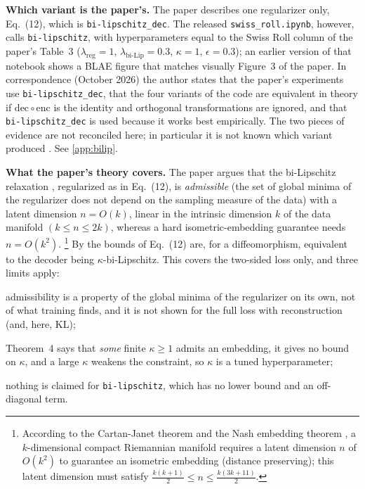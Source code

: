 \textbf{Which variant is the paper's.} The paper describes one regularizer only,
Eq.~(12), which is \texttt{bi-lipschitz\_dec}. The released \texttt{swiss\_roll.ipynb},
however, calls \texttt{bi-lipschitz}, with hyperparameters equal to the Swiss Roll column
of the paper's Table~3 ($\lambda_{\mathrm{reg}}=1$, $\lambda_{\text{bi-Lip}}=0.3$,
$\kappa=1$, $\epsilon=0.3$); an earlier version of that notebook shows a BLAE figure that
matches visually Figure~3 of the paper. In correspondence (October 2026) the author states that
the paper's experiments use \texttt{bi-lipschitz\_dec}, that the four variants of the code
are equivalent in theory if $\mathrm{dec}\circ\mathrm{enc}$ is the identity and orthogonal
transformations are ignored, and that \texttt{bi-lipschitz\_dec} is used because it works
best empirically. The two pieces of evidence are not reconciled here; in particular it is
not known which variant produced \cite[Figure~3]{zhan2026blae}. See \cref{app:bilip}.

\textbf{What the paper's theory covers.} The paper argues \cite[Theorem~4]{zhan2026blae}
that the bi-Lipschitz relaxation \cite[Definition~4]{zhan2026blae}, regularized as in
Eq.~(12), is \emph{admissible} \cite[Definition~3]{zhan2026blae} (the set of global minima
of the regularizer does not depend on the sampling measure of the data) with a latent
dimension $n=O(k)$, linear in the intrinsic dimension $k$ of the data manifold
$(k \leq n \leq 2k)$, whereas a hard isometric-embedding guarantee needs $n=O(k^2)$.
\footnote{According to the Cartan-Janet theorem \cite{burstin1931,cartan1927,janet1926} and the 
Nash embedding theorem \cite{nash1956}, a $k$-dimensional compact 
Riemannian manifold requires a latent dimension $n$ of $O(k^2)$ to guarantee an isometric embedding
(distance preserving); this latent dimension must satisfy 
$\frac{k(k+1)}{2} \le n \le \frac{k(3k+11)}{2}$.}
By \cite[Theorem~3]{zhan2026blae} the bounds of Eq.~(12) are, for a diffeomorphism,
equivalent to the decoder being $\kappa$-bi-Lipschitz. This covers the two-sided loss
only, and three limits apply: 
\begin{enumerate*}[label=(\roman*)]
\item admissibility is a property of the global minima of
the regularizer on its own, not of what training finds, and it is not shown for the full
loss with reconstruction (and, here, KL); 
\item Theorem~4 says that \emph{some} finite
$\kappa\ge1$ admits an embedding, it gives no bound on $\kappa$, and a large $\kappa$
weakens the constraint, so $\kappa$ is a tuned hyperparameter; 
\item nothing is claimed
for \texttt{bi-lipschitz}, which has no lower bound and an off-diagonal term.
\end{enumerate*}


